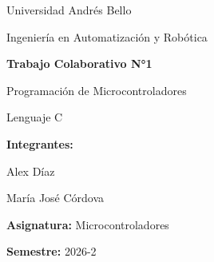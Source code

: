 \documentclass[12pt,a4paper]{article}
\begin{document}


\begin{titlepage}

    \centering

    {\Large Universidad Andrés Bello\par}

    \vspace{0.5cm}

    {\large Ingeniería en Automatización y Robótica\par}

    \vspace{2cm}

    {\Huge\bfseries Trabajo Colaborativo N°1\par}

    \vspace{0.5cm}

    {\Large Programación de Microcontroladores\par}

    \vspace{0.3cm}

    {\Large Lenguaje C\par}

    \vfill

    \begin{flushleft}

    \textbf{Integrantes:}

    Alex Díaz

    María José Córdova

    \vspace{0.5cm}

    \textbf{Asignatura:} Microcontroladores

    \vspace{0.5cm}

    \textbf{Semestre:} 2026-2

    \end{flushleft}

    \vfill

\end{titlepage}



\tableofcontents
\end{document}
